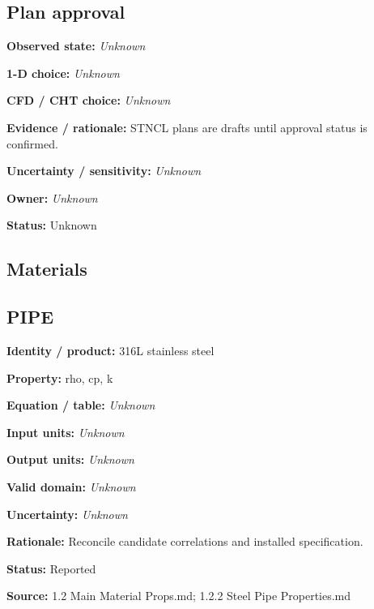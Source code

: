 \documentclass[11pt]{article}
\begin{document}
\begin{minipage}{\textwidth}\small\setlength{\parskip}{2pt}
\subsection*{Plan approval}
\textbf{Observed state:} \textit{Unknown}\par
\textbf{1-D choice:} \textit{Unknown}\par
\textbf{CFD / CHT choice:} \textit{Unknown}\par
\textbf{Evidence / rationale:} STNCL plans are drafts until approval status is confirmed.\par
\textbf{Uncertainty / sensitivity:} \textit{Unknown}\par
\textbf{Owner:} \textit{Unknown}\par
\textbf{Status:} Unknown\par
\end{minipage}\par\vspace{5pt}
\clearpage\subsection{Materials}
\begin{minipage}{\textwidth}\small\setlength{\parskip}{2pt}
\subsection*{PIPE}
\textbf{Identity / product:} 316L stainless steel\par
\textbf{Property:} rho, cp, k\par
\textbf{Equation / table:} \textit{Unknown}\par
\textbf{Input units:} \textit{Unknown}\par
\textbf{Output units:} \textit{Unknown}\par
\textbf{Valid domain:} \textit{Unknown}\par
\textbf{Uncertainty:} \textit{Unknown}\par
\textbf{Rationale:} Reconcile candidate correlations and installed specification.\par
\textbf{Status:} Reported\par
\textbf{Source:} 1.2 Main Material Props.md; 1.2.2 Steel Pipe Properties.md\par
\end{minipage}\par\vspace{5pt}
\end{document}
